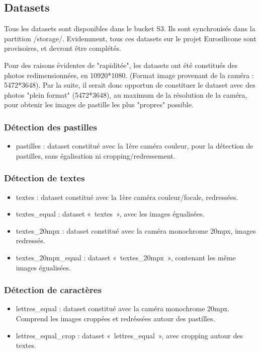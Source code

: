 \subsection{Datasets}
Tous les datasets sont disponibles dans le bucket S3.
Ils sont synchronisés dans la partition /storage/.
Evidemment, tous ces datasets sur le projet Eurosilicone sont provisoires, et devront être complétés.

Pour des raisons évidentes de "rapiditée", les datasets ont été constitués des photos redimensionnées, en 10920*1080. (Format image provenant de la caméra : 5472*3648).
Par la suite, il serait donc opportun de constituer le dataset avec des photos "plein format" (5472*3648), au maximum de la résolution de la caméra, pour obtenir les images de pastille les plus "propres" possible.

\subsubsection{Détection des pastilles}
\begin{itemize}
    \item pastilles : dataset constitué avec la 1ère caméra couleur, pour la détection de pastilles, sans égalisation ni cropping/redressement.
\end{itemize}

\subsubsection{Détection de textes}
\begin{itemize}
    \item textes : dataset constitué avec la 1ère caméra couleur/focale, redressées.
    \item textes_equal : dataset « textes », avec les images égualisées.
    \item textes_20mpx : dataset constitué avec la caméra monochrome 20mpx, images redressés.
    \item textes_20mpx_equal : dataset « textes_20mpx », contenant les même images égualisées.
\end{itemize}

\subsubsection{Détection de caractères}
\begin{itemize}
    \item lettres_equal : dataset constitué avec la caméra monochrome 20mpx. Comprend les images croppées et redréssées autour des pastilles.
    \item lettres_equal_crop : dataset « lettres_equal », avec cropping autour des textes.
\end{itemize}

